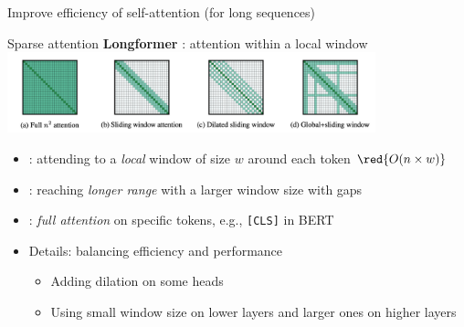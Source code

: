 \documentclass[usenames,dvipsnames,notes,11pt,aspectratio=169,hyperref={colorlinks=true, linkcolor=blue}]{beamer}
\begin{document}
\begin{frame}
    {Improve efficiency of self-attention (for long sequences)}


\end{frame}

\begin{frame}
    {Sparse attention}
    \textbf{Longformer} : attention within a local window\\[1ex]

        {\includegraphics[width=0.8\textwidth]{figures/longformer}}

    \begin{itemize}
        \item {}: attending to a \textit{local} window of size $w$ around each token $\red{O(n\times w)}$
        \item {}: reaching \textit{longer range} with a larger window size with gaps
        \item {}: \textit{full attention} on specific tokens, e.g., \texttt{[CLS]} in BERT
            \pause
        \item Details: balancing efficiency and performance
            \begin{itemize}
                \item Adding dilation on some heads
                \item Using small window size on lower layers and larger ones on higher layers
            \end{itemize}
    \end{itemize}
\end{frame}
\end{document}

